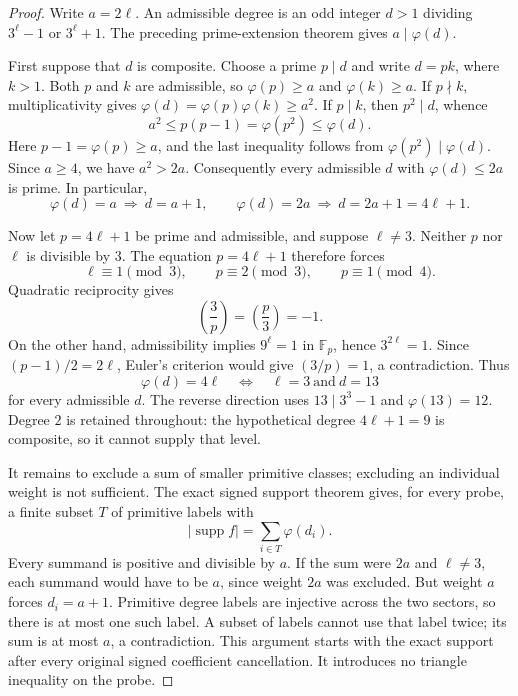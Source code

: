 \documentclass[11pt]{article}
\begin{document}
\begin{proof}
Write \(a=2\ell\). An admissible degree is an odd integer
\(d>1\) dividing \(3^\ell-1\) or \(3^\ell+1\).
The preceding prime-extension theorem gives
\(a\mid\varphi(d)\).

First suppose that \(d\) is composite. Choose a prime \(p\mid d\)
and write \(d=pk\), where \(k>1\). Both \(p\) and \(k\) are
admissible, so \(\varphi(p)\ge a\) and \(\varphi(k)\ge a\).
If \(p\nmid k\), multiplicativity gives
\(\varphi(d)=\varphi(p)\varphi(k)\ge a^2\).
If \(p\mid k\), then \(p^2\mid d\), whence
\[
       a^2\le p(p-1)=\varphi(p^2)\le\varphi(d).
\]
Here \(p-1=\varphi(p)\ge a\), and the last inequality follows
from \(\varphi(p^2)\mid\varphi(d)\).
Since \(a\ge4\), we have \(a^2>2a\).
Consequently every admissible \(d\) with \(\varphi(d)\le2a\)
is prime. In particular,
\[
 \varphi(d)=a\ \Longrightarrow\ d=a+1,\qquad
 \varphi(d)=2a\ \Longrightarrow\ d=2a+1=4\ell+1.
\]

Now let \(p=4\ell+1\) be prime and admissible, and suppose
\(\ell\ne3\). Neither \(p\) nor \(\ell\) is divisible by \(3\).
The equation \(p=4\ell+1\) therefore forces
\[
           \ell\equiv1\pmod3,\qquad
           p\equiv2\pmod3,\qquad p\equiv1\pmod4.
\]
Quadratic reciprocity gives
\[
                    \left(\frac3p\right)
                    =\left(\frac p3\right)=-1.
\]
On the other hand, admissibility implies \(9^\ell=1\)
in \(\mathbb F_p\), hence \(3^{2\ell}=1\).
Since \((p-1)/2=2\ell\), Euler's criterion would give
\((3/p)=1\), a contradiction. Thus
\[
       \varphi(d)=4\ell
             \quad\Longleftrightarrow\quad
                    \ell=3\ \text{and}\ d=13
\]
for every admissible \(d\). The reverse direction uses
\(13\mid3^3-1\) and \(\varphi(13)=12\).
Degree \(2\) is retained throughout: the hypothetical degree
\(4\ell+1=9\) is composite, so it cannot supply that level.

It remains to exclude a sum of smaller primitive classes;
excluding an individual weight is not sufficient.
The exact signed support theorem gives, for every probe,
a finite subset \(T\) of primitive labels with
\[
                |\operatorname{supp}f|
                         =\sum_{i\in T}\varphi(d_i).
\]
Every summand is positive and divisible by \(a\).
If the sum were \(2a\) and \(\ell\ne3\), each summand
would have to be \(a\), since weight \(2a\) was excluded.
But weight \(a\) forces \(d_i=a+1\).
Primitive degree labels are injective across the two sectors,
so there is at most one such label. A subset of labels cannot
use that label twice; its sum is at most \(a\), a contradiction.
This argument starts with the exact support after every
original signed coefficient cancellation. It introduces
no triangle inequality on the probe.


\end{proof}
\end{document}
